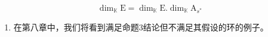 \[
\dim_ {\mathbb {K}} \mathrm{E} = \dim_ {\mathbb {K}} \mathrm{E}. \dim_ {\mathbb {K}} \mathrm{A} _ {s ^ {*}}\tag{2}
\]

\begin{enumerate}
\def\labelenumi{(\arabic{enumi})}
\setcounter{enumi}{3}
\tightlist
\item
  在第八章中，我们将看到满足命题3结论但不满足其假设的环的例子。
\end{enumerate}
\relax{}
